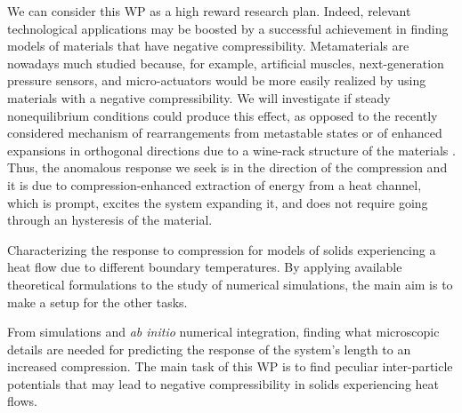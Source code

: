 \begin{workpackage}
\begin{wpdescription}
We can consider this WP as a high reward research plan. Indeed, relevant technological applications
may be boosted by a successful achievement in finding models of materials that have negative compressibility.
Metamaterials are nowadays much studied \cite{NM12,CG15} because, for example, artificial muscles,
next-generation pressure sensors, and micro-actuators would be
more easily realized by using materials with a negative compressibility. We will investigate
if steady nonequilibrium conditions could produce this effect, as opposed to the recently considered 
mechanism of rearrangements from metastable states \cite{NM12} or of enhanced expansions in orthogonal directions
due to a wine-rack structure of the materials \cite{CG15}. Thus, the anomalous response we seek is in the direction
of the compression and it is due to compression-enhanced extraction of energy from a heat channel,
which is prompt, excites the system expanding it, 
and does not require going through an hysteresis of the material. 

\printbibliography[heading=proposal-bib,env=proposal-env]

\end{wpdescription}

\begin{tasklist}

  \begin{task}[title=TASK1,id=task1,PM=3,lead=UNIPD,wphases={0-12!1,12-24!0.5}]
 
    Characterizing the response to compression
    for models of solids experiencing a heat flow due to different boundary temperatures.
    By applying available theoretical formulations to the study of numerical simulations,
    the main aim is to make a setup for the other tasks.
    
  \end{task}

  \begin{task}[title=TASK2,id=task2,PM=3,lead=UNIPD,partners=KUL,wphases={12-24!0.5,24-36!1}]

    From simulations and {\it ab initio} numerical integration, finding what microscopic details
    are needed  for
    predicting the response of the system's length to an increased compression.
    The main task of this WP is to
        find peculiar inter-particle potentials that may lead to negative 
        compressibility in solids experiencing heat flows.     
  \end{task}


\end{tasklist}
\end{workpackage}
